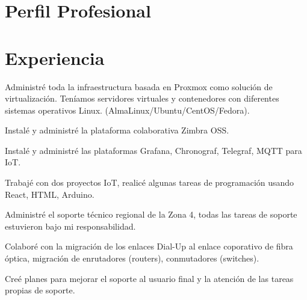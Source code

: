 \documentclass[]{plushcv}
\begin{document}
\begin{minipage}[t]{0.70\textwidth} 


\section{Perfil Profesional}
\runsubsection{}
\sectionsep

\section{Experiencia}
\vspace{\topsep} %
\begin{tightemize}
\sectionsep
\item Administré toda la infraestructura basada en Proxmox como solución de virtualización. Teníamos servidores virtuales y contenedores con diferentes sistemas operativos Linux. (AlmaLinux/Ubuntu/CentOS/Fedora).
\item Instalé y administré la plataforma colaborativa Zimbra OSS.
\item Instalé y administré las plataformas Grafana, Chronograf, Telegraf, MQTT para IoT.
\item Trabajé con dos proyectos IoT, realicé algunas tareas de programación usando React, HTML, Arduino.
\end{tightemize}
\sectionsep

\begin{tightemize}
\sectionsep
\item Administré el soporte técnico regional de la Zona 4, todas las tareas de soporte estuvieron bajo mi responsabilidad.
\item Colaboré con la migración de los enlaces Dial-Up al enlace coporativo de fibra óptica, migración de enrutadores (routers), conmutadores (switches).
\item Creé planes para mejorar el soporte al usuario final y la atención de las tareas propias de soporte.
\end{tightemize}
\sectionsep


\end{minipage}
\end{document}
